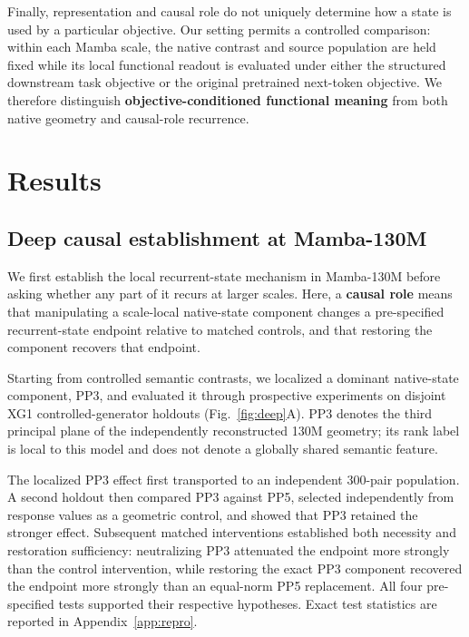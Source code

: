 \documentclass{article}
\begin{document}
Finally, representation and causal role do not uniquely determine how a state is used by a particular objective. Our setting permits a controlled comparison: within each Mamba scale, the native contrast and source population are held fixed while its local functional readout is evaluated under either the structured downstream task objective or the original pretrained next-token objective. We therefore distinguish \textbf{objective-conditioned functional meaning} from both native geometry and causal-role recurrence.

\section{Results}
\label{sec:results}

\subsection{Deep causal establishment at Mamba-130M}
\label{sec:deep}

We first establish the local recurrent-state mechanism in Mamba-130M before asking whether any part of it recurs at larger scales. Here, a \textbf{causal role} means that manipulating a scale-local native-state component changes a pre-specified recurrent-state endpoint relative to matched controls, and that restoring the component recovers that endpoint.

Starting from controlled semantic contrasts, we localized a dominant native-state component, PP3, and evaluated it through prospective experiments on disjoint XG1 controlled-generator holdouts (Fig.~\ref{fig:deep}A). PP3 denotes the third principal plane of the independently reconstructed 130M geometry; its rank label is local to this model and does not denote a globally shared semantic feature.

The localized PP3 effect first transported to an independent 300-pair population. A second holdout then compared PP3 against PP5, selected independently from response values as a geometric control, and showed that PP3 retained the stronger effect. Subsequent matched interventions established both necessity and restoration sufficiency: neutralizing PP3 attenuated the endpoint more strongly than the control intervention, while restoring the exact PP3 component recovered the endpoint more strongly than an equal-norm PP5 replacement. All four pre-specified tests supported their respective hypotheses. Exact test statistics are reported in Appendix~\ref{app:repro}.
\end{document}
